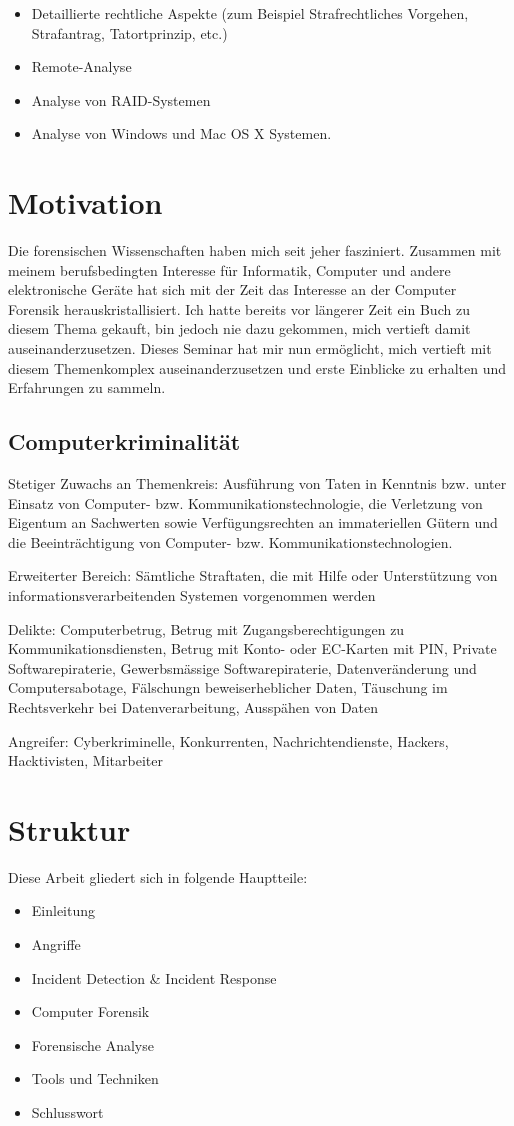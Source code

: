 \begin{itemize}
\item Detaillierte rechtliche Aspekte (zum Beispiel Strafrechtliches Vorgehen, Strafantrag, Tatortprinzip, etc.)
\item Remote-Analyse
\item Analyse von RAID-Systemen
\item Analyse von Windows und Mac OS X Systemen.
\end{itemize}

\section{Motivation}
Die forensischen Wissenschaften haben mich seit jeher fasziniert. Zusammen mit meinem berufsbedingten Interesse für Informatik, Computer und andere elektronische Geräte hat sich mit der Zeit das Interesse an der Computer Forensik herauskristallisiert. Ich hatte bereits vor längerer Zeit ein Buch zu diesem Thema gekauft, bin jedoch nie dazu gekommen, mich vertieft damit auseinanderzusetzen. Dieses Seminar hat mir nun ermöglicht, mich vertieft mit diesem Themenkomplex auseinanderzusetzen und erste Einblicke zu erhalten und Erfahrungen zu sammeln.

\subsection{Computerkriminalität}
Stetiger Zuwachs an
Themenkreis: Ausführung von Taten in Kenntnis bzw. unter Einsatz von Computer- bzw. Kommunikationstechnologie, die Verletzung von Eigentum an Sachwerten sowie Verfügungsrechten an immateriellen Gütern und die Beeinträchtigung von Computer- bzw. Kommunikationstechnologien.

Erweiterter Bereich: Sämtliche Straftaten, die mit Hilfe oder Unterstützung von informationsverarbeitenden Systemen vorgenommen werden

Delikte: Computerbetrug, Betrug mit Zugangsberechtigungen zu Kommunikationsdiensten, Betrug mit Konto- oder EC-Karten mit PIN, Private Softwarepiraterie, Gewerbsmässige Softwarepiraterie, Datenveränderung und Computersabotage, Fälschungn beweiserheblicher Daten, Täuschung im Rechtsverkehr bei Datenverarbeitung, Ausspähen von Daten

Angreifer: Cyberkriminelle, Konkurrenten, Nachrichtendienste, Hackers, Hacktivisten, Mitarbeiter

\section{Struktur}
Diese Arbeit gliedert sich in folgende Hauptteile:
\begin{itemize}
\item Einleitung
\item Angriffe
\item Incident Detection \& Incident Response
\item Computer Forensik
\item Forensische Analyse
\item Tools und Techniken
\item Schlusswort
\end{itemize}

